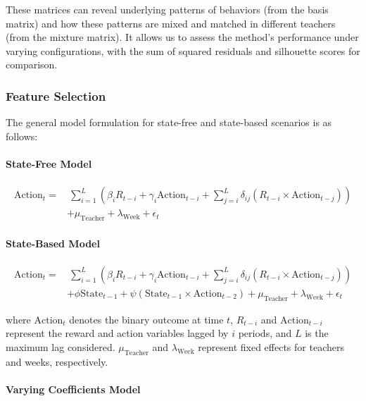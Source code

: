 \documentclass[
  number,
  preprint,
  3p,
  onecolumn]{elsarticle}
\let\oldparagraph\paragraph
\renewcommand{\paragraph}[1]{\oldparagraph{#1}\mbox{}}
\begin{document}
These matrices can reveal underlying patterns of behaviors (from the
basis matrix) and how these patterns are mixed and matched in different
teachers (from the mixture matrix). It allows us to assess the method's
performance under varying configurations, with the sum of squared
residuals and silhouette scores for comparison.

\subsubsection{Feature Selection}\label{feature-selection-1}

The general model formulation for state-free and state-based scenarios
is as follows:

\paragraph{State-Free Model}\label{state-free-model}

\begin{align*}
\text{Action}_t =& \ \sum_{i=1}^{L} \left( \beta_{i} R_{t-i} + \gamma_i \text{Action}_{t-i} + \sum_{j=i}^{L} \delta_{ij} (R_{t-i} \times \text{Action}_{t-j}) \right) \\
& + \mu_{\text{Teacher}} + \lambda_{\text{Week}} + \epsilon_t 
\end{align*}

\paragraph{State-Based Model}\label{state-based-model}

\begin{align*}
\text{Action}_t =& \ \sum_{i=1}^{L} \left( \beta_{i} R_{t-i} + \gamma_i \text{Action}_{t-i} + \sum_{j=i}^{L} \delta_{ij} (R_{t-i} \times \text{Action}_{t-j}) \right) \\
& + \phi \text{State}_{t-1} + \psi (\text{State}_{t-1} \times \text{Action}_{t-2}) + \mu_{\text{Teacher}} + \lambda_{\text{Week}} + \epsilon_t
\end{align*}

where \(\text{Action}_t\) denotes the binary outcome at time \(t\),
\(R_{t-i}\) and \(\text{Action}_{t-i}\) represent the reward and action
variables lagged by \(i\) periods, and \(L\) is the maximum lag
considered. \(\mu_{\text{Teacher}}\) and \(\lambda_{\text{Week}}\)
represent fixed effects for teachers and weeks, respectively.

\paragraph{Varying Coefficients Model}\label{varying-coefficients-model}
\end{document}
